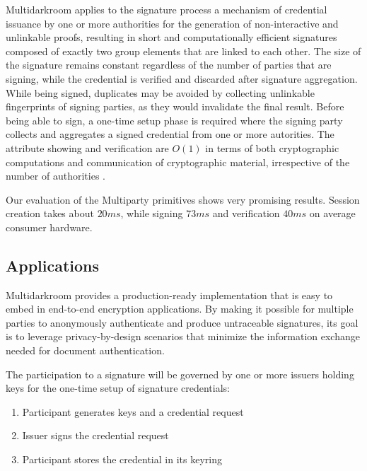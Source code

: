 \documentclass[twocolumn]{article}
\begin{document}
Multidarkroom applies to the signature process a mechanism of credential
issuance by one or more authorities for the generation of
non-interactive and unlinkable proofs, resulting in short and
computationally efficient signatures composed of exactly two group
elements that are linked to each other. The size of the signature
remains constant regardless of the number of parties that are signing,
while the credential is verified and discarded after signature
aggregation. While being signed, duplicates may be avoided by collecting
unlinkable fingerprints of signing parties, as they would invalidate the
final result. Before being able to sign, a one-time setup phase is
required where the signing party collects and aggregates a signed
credential from one or more autorities. The attribute showing and
verification are $O(1)$ in terms of both cryptographic computations and
communication of cryptographic material, irrespective of the number of
authorities \citep{coconut-2018}.

Our evaluation of the Multiparty primitives shows very promising
results. Session creation takes about $20ms$, while signing $73ms$ and
verification $40ms$ on average consumer hardware.

\subsection*{Applications}

Multidarkroom provides a production-ready implementation that is easy to embed in end-to-end encryption applications. By making it possible for multiple parties to anonymously authenticate and produce untraceable signatures, its goal is to leverage privacy-by-design scenarios that minimize the information exchange needed for document authentication.

The participation to a signature will be governed by one or more issuers holding keys for the one-time setup of signature credentials:

\begin{enumerate} %
  \item Participant generates keys and a credential request
  \item Issuer signs the credential request
  \item Participant stores the credential in its keyring
\end{enumerate}

\end{document}
